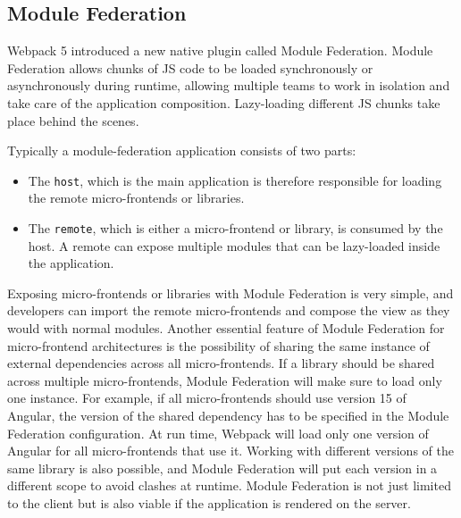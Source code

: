 \subsection{Module Federation}\label{subsection:background:micro-frontend:module-federation}

Webpack 5 introduced a new native plugin called Module Federation. Module Federation allows chunks of \ac{JS} code to be loaded synchronously or asynchronously during runtime, allowing multiple teams to work in isolation and take care of the application composition. Lazy-loading different \ac{JS} chunks take place behind the scenes. \cite[81]{book:2021:mezzalira:applied-methods:building-micro-frontends}

\bigskip

\noindent Typically a module-federation application consists of two parts: \cite[81]{book:2021:mezzalira:applied-methods:building-micro-frontends}

\begin{itemize}
  \item The \texttt{host}, which is the main application is therefore responsible for loading the remote micro-frontends or libraries.
  \item The \texttt{remote}, which is either a micro-frontend or library, is consumed by the host. A remote can expose multiple modules that can be lazy-loaded inside the application.
\end{itemize}

\noindent Exposing micro-frontends or libraries with Module Federation is very simple, and developers can import the remote micro-frontends and compose the view as they would with normal modules. Another essential feature of Module Federation for micro-frontend architectures is the possibility of sharing the same instance of external dependencies across all micro-frontends. If a library should be shared across multiple micro-frontends, Module Federation will make sure to load only one instance. For example, if all micro-frontends should use version 15 of Angular, the version of the shared dependency has to be specified in the Module Federation configuration. At run time, Webpack will load only one version of Angular for all micro-frontends that use it. Working with different versions of the same library is also possible, and Module Federation will put each version in a different scope to avoid clashes at runtime. Module Federation is not just limited to the client but is also viable if the application is rendered on the server. \cite[82-83]{book:2021:mezzalira:applied-methods:building-micro-frontends}

